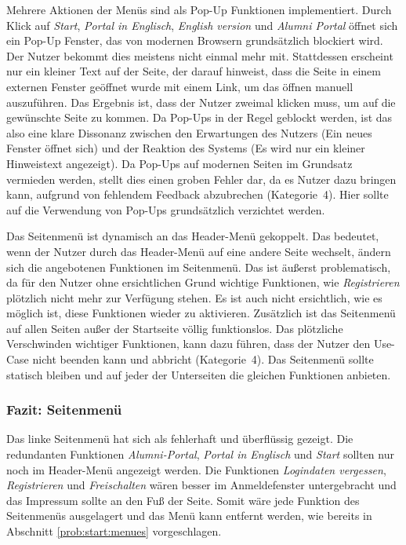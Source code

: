{Mehrere Aktionen der Menüs sind als Pop-Up Funktionen implementiert. Durch Klick auf \emph{Start}, \emph{Portal in Englisch}, \emph{English version} und \emph{Alumni Portal} öffnet sich ein Pop-Up Fenster, das von modernen Browsern grundsätzlich blockiert wird. 
Der Nutzer bekommt dies meistens nicht einmal mehr mit. Stattdessen erscheint nur ein kleiner Text auf der Seite, der darauf hinweist, dass die Seite in einem externen Fenster geöffnet wurde mit einem Link, um das öffnen manuell auszuführen.
Das Ergebnis ist, dass der Nutzer zweimal klicken muss, um auf die gewünschte Seite zu kommen.
}
{Da Pop-Ups in der Regel geblockt werden, ist das also eine klare Dissonanz zwischen den Erwartungen des Nutzers (Ein neues Fenster öffnet sich) und der Reaktion des Systems (Es wird nur ein kleiner Hinweistext angezeigt). Da Pop-Ups auf modernen Seiten im Grundsatz vermieden werden, stellt dies einen groben Fehler dar, da es Nutzer dazu bringen kann, aufgrund von fehlendem Feedback abzubrechen (Kategorie~4).
}
{Hier sollte auf die Verwendung von Pop-Ups grundsätzlich verzichtet werden.
}\label{prob:start:popup}

{Das Seitenmenü ist dynamisch an das Header-Menü gekoppelt. Das bedeutet, wenn der Nutzer durch das Header-Menü auf eine andere Seite wechselt, ändern sich die angebotenen Funktionen im Seitenmenü. Das ist äußerst problematisch, da für den Nutzer ohne ersichtlichen Grund wichtige Funktionen, wie \emph{Registrieren} plötzlich nicht mehr zur Verfügung stehen. Es ist auch nicht ersichtlich, wie es möglich ist, diese Funktionen wieder zu aktivieren.
Zusätzlich ist das Seitenmenü auf allen Seiten außer der Startseite völlig funktionslos. 
}
{Das plötzliche Verschwinden wichtiger Funktionen, kann dazu führen, dass der Nutzer den Use-Case nicht beenden kann und abbricht (Kategorie~4).
}
{Das Seitenmenü sollte statisch bleiben und auf jeder der Unterseiten die gleichen Funktionen anbieten.
}\label{prob:start:seitenmenue}

\subsubsection*{Fazit: Seitenmenü}
Das linke Seitenmenü hat sich als fehlerhaft und überflüssig gezeigt. 
Die redundanten Funktionen \emph{Alumni-Portal}, \emph{Portal in Englisch} und \emph{Start} sollten nur noch im Header-Menü angezeigt werden. Die Funktionen \emph{Logindaten vergessen}, \emph{Registrieren} und \emph{Freischalten} wären besser im Anmeldefenster untergebracht und das Impressum sollte an den Fuß der Seite.
Somit wäre jede Funktion des Seitenmenüs ausgelagert und das Menü kann entfernt werden, wie bereits in Abschnitt \ref{prob:start:menues} vorgeschlagen.
